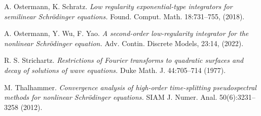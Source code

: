 \documentclass[10pt,a4paper]{article}
\begin{document}
\begin{thebibliography}{99}
      {\rm A. Ostermann, K. Schratz.}
      {\em Low regularity exponential-type integrators for semilinear Schr\"odinger equations.}
      Found. Comput. Math. 18:731--755, (2018).

      {\rm A. Ostermann, Y. Wu, F. Yao.}
      {\em A second-order low-regularity integrator for the nonlinear Schr\"odinger equation.}
      Adv. Contin. Discrete Models, 23:14, (2022).

      {\rm R. S. Strichartz.}
      {\em Restrictions of Fourier transforms to quadratic surfaces and decay of solutions of wave equations.}
      Duke Math. J. 44:705--714 (1977).

      {\rm M. Thalhammer.}
      {\em Convergence analysis of high-order time-splitting pseudospectral methods for nonlinear Schr\"odinger equations.}
      SIAM J. Numer. Anal. 50(6):3231--3258 (2012).

  \end{thebibliography}
\end{document}

